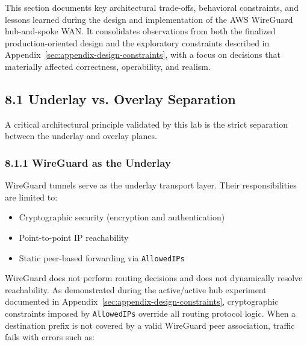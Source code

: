 \documentclass[11pt]{article}
\begin{document}
This section documents key architectural trade-offs, behavioral constraints, and lessons learned during the design and implementation of the AWS WireGuard hub-and-spoke WAN. It consolidates observations from both the finalized production-oriented design and the exploratory constraints described in Appendix~\ref{sec:appendix-design-constraints}, with a focus on decisions that materially affected correctness, operability, and realism.

%
%
\subsection{8.1 Underlay vs. Overlay Separation}
\label{subsec:underlay-overlay-separation}

A critical architectural principle validated by this lab is the strict separation between the underlay and overlay planes.

\subsubsection{8.1.1 WireGuard as the Underlay}
\label{subsubsec:wireguard-underlay}

WireGuard tunnels serve as the underlay transport layer. Their responsibilities are limited to:
\begin{itemize}
\item Cryptographic security (encryption and authentication)
\item Point-to-point IP reachability
\item Static peer-based forwarding via \texttt{AllowedIPs}
\end{itemize}

WireGuard does not perform routing decisions and does not dynamically resolve reachability. As demonstrated during the active/active hub experiment documented in Appendix~\ref{sec:appendix-design-constraints}, cryptographic constraints imposed by \texttt{AllowedIPs} override all routing protocol logic. When a destination prefix is not covered by a valid WireGuard peer association, traffic fails with errors such as:
\end{document}
